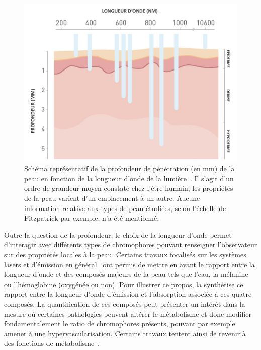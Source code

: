 \begin{figure}[H]
    \centering
    \includegraphics[width=0.8\linewidth]{contents/chapter_2/resources/scheme_light_penatrating.pdf}
    \caption{Schéma représentatif de la profondeur de pénétration (en mm) de la peau en fonction de la longueur d’onde de la lumière~\cite{Barolet2008}. Il s'agit d'un ordre de grandeur moyen constaté chez l'être humain, les propriétés de la peau varient d'un emplacement à un autre. Aucune information relative aux types de peau étudiées, selon l'échelle de Fitzpatrick par exemple, n'a été mentionné.}
    \label{fig:scheme_light_penatrating}
\end{figure}\par

Outre la question de la profondeur, le choix de la longueur d'onde permet d'interagir avec différents types de chromophores pouvant renseigner l'observateur sur des propriétés locales à la peau. Certains travaux focalisés sur les systèmes lasers et d'émission en général~\cite{Stewart2013} ont permis de mettre en avant le rapport entre la longueur d'onde et des composés majeurs de la peau tels que l'eau, la mélanine ou l'hémoglobine (oxygénée ou non). Pour illustrer ce propos, la  synthétise ce rapport entre la longueur d'onde d'émission et l'absorption associée à ces quatre composés. La quantification de ces composés peut présenter un intérêt dans la mesure où certaines pathologies peuvent altérer le métabolisme et donc modifier fondamentalement le ratio de chromophores présents, pouvant par exemple amener à une hypervascularisation. Certains travaux tentent ainsi de revenir à des fonctions de métabolisme~\cite{Im2016}.\par

